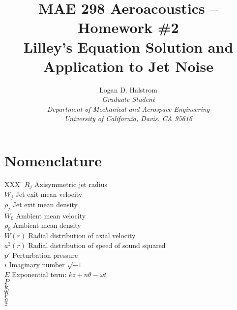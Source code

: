 \documentclass[]{aiaa-tc}%
\title{MAE 298 Aeroacoustics -- Homework \#2 \\ Lilley's Equation Solution and Application to Jet Noise}
\author{
  Logan D. Halstrom \\
  {\normalsize\itshape Graduate Student} \\
  {\normalsize\itshape Department of Mechanical and Aerospace Engineering} \\
  {\normalsize\itshape University of California, Davis, CA 95616}
       }
\begin{document}
\maketitle




\section*{Nomenclature}

\begin{multicols}{2}

\begin{tabbing}
  XXX \= \kill%
  $R_j$               \> Axisymmetric jet radius \\
  $W_j$               \> Jet exit mean velocity \\
  $\overline{\rho_j}$ \> Jet exit mean density \\
  $W_0$               \> Ambient mean velocity \\
  $\overline{\rho_0}$ \> Ambient mean density \\
  $W(r)$              \> Radial distribution of axial velocity \\
  $\overline{a^2}(r)$ \> Radial distribution of speed of sound squared\\
  $p'$                \> Perturbation pressure \\
  $i$                 \> Imaginary number $\sqrt{-1}$ \\
  $E$                 \> Exponential term: $kz + n\theta -\omega t$ \\
  $P$                 \>  \\
  $k$                 \>  \\
  $\omega$            \>  \\
  $n$                 \>  \\
  $r$                 \>  \\
  $\theta$            \>  \\
  $z$                 \>  \\



\end{tabbing}

\end{multicols}
\end{document}

